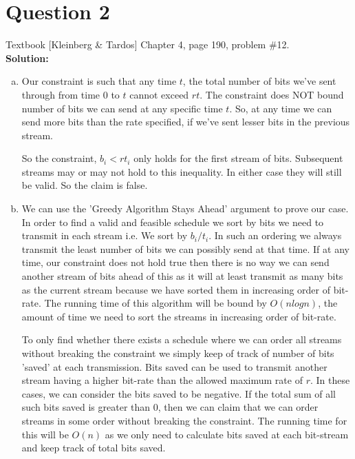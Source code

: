 \documentclass[11pt]{article}
\begin{document}
\section{Question 2} Textbook [Kleinberg \& Tardos] Chapter 4, page 190, problem \#12. \\
\textbf{Solution:} \\
\begin{enumerate}[(a)]
\item Our constraint is such that any time $ t $, the total number of bits we've sent through from time 0 to $ t $ cannot exceed $ rt $. The constraint does NOT bound number of bits we can send at any specific time $ t $. So, at any time we can send more bits than the rate specified, if we've sent lesser bits in the previous stream.

So the constraint, $ b_i < rt_i $ only holds for the first stream of bits. Subsequent streams may or may not hold to this inequality. In either case they will still be valid. So the claim is false.

\item We can use the 'Greedy Algorithm Stays Ahead' argument to prove our case. In order to find a valid and feasible schedule we sort by bits we need to transmit in each stream i.e. We sort by $ b_i/t_i $. In such an ordering we always transmit the least number of bits we can possibly send at that time. If at any time, our constraint does not hold true then there is no way we can send another stream of bits ahead of this as it will at least transmit as many bits as the current stream because we have sorted them in increasing order of bit-rate. The running time of this algorithm will be bound by $ O(nlogn) $, the amount of time we need to sort the streams in increasing order of bit-rate.

To only find whether there exists a schedule where we can order all streams without breaking the constraint we simply keep of track of number of bits 'saved' at each transmission. Bits saved can be used to transmit another stream having a higher bit-rate than the allowed maximum rate of $ r $. In these cases, we can consider the bits saved to be negative. If the total sum of all such bits saved is greater than 0, then we can claim that we can order streams in some order without breaking the constraint. The running time for this will be $ O(n) $ as we only need to calculate bits saved at each bit-stream and keep track of total bits saved.
\end{enumerate}


\clearpage
\end{document}
